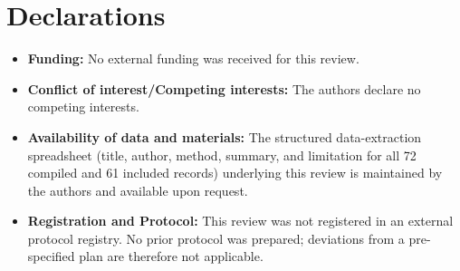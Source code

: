 \documentclass[sn-mathphys-num,Numbered,pdflatex]{sn-jnl}
\begin{document}
\backmatter

\section*{Declarations}

\begin{itemize}
\item \textbf{Funding:} No external funding was received for this review.
\item \textbf{Conflict of interest/Competing interests:} The authors declare no competing interests.
\item \textbf{Availability of data and materials:} The structured data-extraction spreadsheet (title, author, method, summary, and limitation for all 72 compiled and 61 included records) underlying this review is maintained by the authors and available upon request.
\item \textbf{Registration and Protocol:} This review was not registered in an external protocol registry. No prior protocol was prepared; deviations from a pre-specified plan are therefore not applicable.
\end{itemize}


\end{document}
